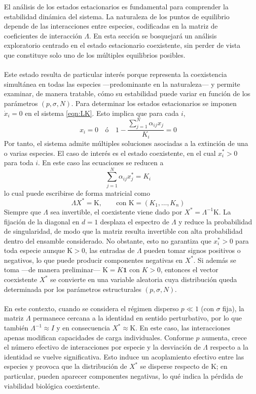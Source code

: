 El análisis de los estados estacionarios es fundamental para comprender la estabilidad dinámica del sistema. La naturaleza de los puntos de equilibrio depende de las interacciones entre especies, codificadas en la matriz de coeficientes de interacción $\Lambda$. En esta sección se bosquejará un análisis exploratorio centrado en el estado estacionario coexistente, sin perder de vista que constituye solo uno de los múltiples equilibrios posibles. \\
\\
Este estado resulta de particular interés porque representa la coexistencia simultánea en todas las especies ---predominante en la naturaleza--- y permite examinar, de manera tratable, cómo su estabilidad puede variar en función de los parámetros $(p,\sigma,N)$. Para determinar los estados estacionarios se imponen $\dot{x}_i=0$ en el sistema \eqref{eqn:LK}. Esto implica que para cada $i$,
\begin{equation}\label{eqn:EcsPuntoFijo}
	x_i=0\quad\text{ó}\quad 1-\frac{\sum_{j=1}^N\alpha_{ij}x_j}{K_i}=0
\end{equation}
Por tanto, el sistema admite múltiples soluciones asociadas a la extinción de una o varias especies. El caso de interés es el estado coexistente, en el cual $x_i^*>0$ para toda $i$. En este caso las ecuaciones se reducen a 
$$\sum_{j=1}^N\alpha_{ij}x_j^*=K_i$$
lo cual puede escribirse de forma matricial como
$$\Lambda X^*=\mathrm{K},\qquad\text{con }\mathrm{K}=(K_1,\dots,K_n)$$
Siempre que $\Lambda$ sea invertible, el coexistente viene dado por $X^*=\Lambda^{-1}\mathrm{K}$. La fijación de la diagonal en $d=1$ desplaza el espectro de $\Lambda$ y reduce la probabilidad de singularidad, de modo que la matriz resulta invertible con alta probabilidad dentro del ensamble considerado. No obstante, esto no garantiza que $x_i^*>0$ para toda especie aunque $\mathrm{K}>0$, las entradas de $\Lambda$ pueden tomar signos positivos o negativos, lo que puede producir componentes negativas en $X^*$. Si además se toma ---de manera preliminar--- $\mathrm{K}=K\textbf{1}$ con $K>0$, entonces el vector coexistente $X^*$ se convierte en una variable aleatoria cuya distribución queda determinada por los parámetros estructurales $(p,\sigma,N)$.\\
\\
En este contexto, cuando se considera el régimen disperso $p\ll 1$ (con $\sigma$ fija), la matriz $\Lambda$ permanece cercana a la identidad en sentido perturbativo, por lo que también $\Lambda^{-1}\approx I$ y en consecuencia $X^*\approx \mathrm{K}$. En este caso, las interacciones apenas modifican capacidades de carga individuales. Conforme $p$ aumenta, crece el número efectivo de interacciones por especie y la desviación de $\Lambda$ respecto a la identidad se vuelve significativa. Esto induce un acoplamiento efectivo entre las especies y provoca que la distribución de $X^*$ se disperse respecto de $\mathrm{K}$; en particular, pueden aparecer componentes negativas, lo qué indica la pérdida de viabilidad biológica coexistente.\\
